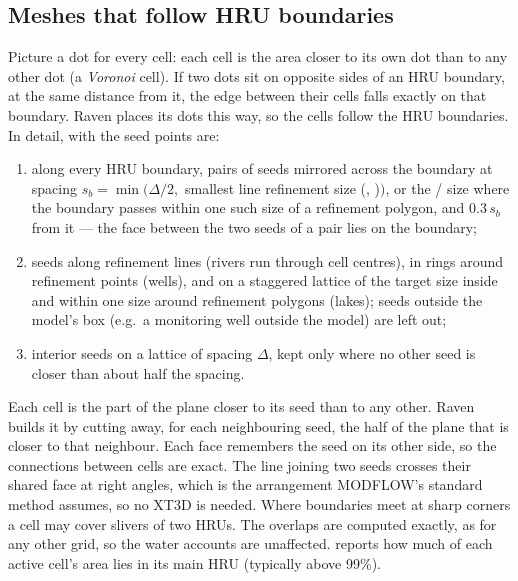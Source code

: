 \subsection{Meshes that follow HRU boundaries}
Picture a dot for every cell: each cell is the area closer to its own dot than to any other dot (a \emph{Voronoi} cell). If
two dots sit on opposite sides of an HRU boundary, at the same distance from it, the edge between their cells falls exactly
on that boundary. Raven places its dots this way, so the cells follow the HRU boundaries. In detail, with
 the seed points are:
\begin{enumerate}
\item along every HRU boundary, pairs of seeds mirrored across the boundary at spacing $s_b=\min(\Delta/2,$ smallest
line refinement size (, )$)$, or the / size where the boundary passes within
one such size of a refinement polygon, and $0.3\,s_b$ from it --- the face between the two seeds of a pair lies on the boundary;
\item seeds along refinement lines (rivers run through cell centres), in rings around refinement points (wells), and on a
staggered lattice of the target size inside and within one size around refinement polygons (lakes); seeds outside the
model's box (e.g.\ a monitoring well outside the model) are left out;
\item interior seeds on a lattice of spacing $\Delta$, kept only where no other seed is closer than about half the spacing.
\end{enumerate}
Each cell is the part of the plane closer to its seed than to any other. Raven builds it by cutting away, for each
neighbouring seed, the half of the plane that is closer to that neighbour. Each face remembers the seed on its other side, so
the connections between cells are exact. The line joining two seeds crosses their shared face at right angles, which is the
arrangement MODFLOW's standard method assumes, so no XT3D is needed. Where boundaries meet at sharp corners a cell may cover slivers of two HRUs. The overlaps are computed exactly, as for any
other grid, so the water accounts are unaffected.  reports how much of each active cell's area lies
in its main HRU (typically above 99\%).

